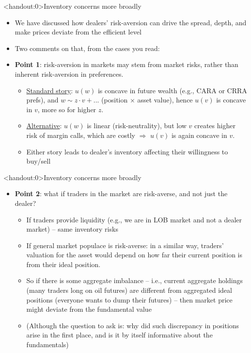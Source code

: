 \documentclass[english,10pt
,aspectratio=169
]{beamer}
\begin{document}
\begin{frame}<handout:0>{Inventory concerns more broadly}
	\begin{itemize}
		\item We have discussed how dealers' risk-aversion can drive the spread, depth, and make prices deviate from the efficient level
		\item Two comments on that, from the cases you read:
		\item \textbf{Point 1}: risk-aversion in markets may stem from market risks, rather than inherent risk-aversion in preferences.
		\begin{itemize}
			\item \underline{Standard story}: $u(w)$ is concave in future wealth (e.g., CARA or CRRA prefs), and $w \sim z \cdot v + ...$ (position $\times$ asset value), hence $u(v)$ is concave in $v$, more so for higher $z$.
			\item \underline{Alternative}: $u(w)$ is linear (risk-neutrality), but low $v$ creates higher risk of margin calls, which are costly $\Rightarrow$ $u(v)$ is again concave in $v$.
			\item Either story leads to dealer's inventory affecting their willingness to buy/sell
		\end{itemize}
	\end{itemize}
\end{frame}


\begin{frame}<handout:0>{Inventory concerns more broadly}
	\begin{itemize}
		\item \textbf{Point 2}: what if traders in the market are risk-averse, and not just the dealer?
		\begin{itemize}
			\item If traders provide liquidity (e.g., we are in LOB market and not a dealer market) -- same inventory risks
			\item If general market populace is risk-averse: in a similar way, traders' valuation for the asset would depend on how far their current position is from their ideal position.
			\item So if there is some aggregate imbalance -- i.e., current aggregate holdings (many traders long on oil futures) are different from aggregated ideal positions (everyone wants to dump their futures) -- then market price might deviate from the fundamental value
			\item (Although the question to ask is: why did such discrepancy in positions arise in the first place, and is it by itself informative about the fundamentals)
		\end{itemize}
	\end{itemize}
\end{frame}
\end{document}
